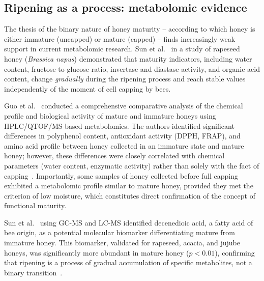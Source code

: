 \subsection{Ripening as a process: metabolomic evidence}

The thesis of the binary nature of honey maturity -- according to
which honey is either immature (uncapped) or mature (capped) --
finds increasingly weak support in current metabolomic research.
Sun et al.~\cite{sun2021} in a study of rapeseed honey
(\textit{Brassica napus}) demonstrated that maturity indicators,
including water content, fructose-to-glucose ratio, invertase and
diastase activity, and organic acid content, change \emph{gradually}
during the ripening process and reach stable values independently
of the moment of cell capping by bees.

Guo et al.~\cite{guo2020} conducted a comprehensive comparative
analysis of the chemical profile and biological activity of mature
and immature honeys using HPLC/QTOF/MS-based metabolomics. The
authors identified significant differences in polyphenol content,
antioxidant activity (DPPH, FRAP), and amino acid profile between
honey collected in an immature state and mature honey; however,
these differences were closely correlated with chemical parameters
(water content, enzymatic activity) rather than solely with
the fact of capping~\cite{guo2020}. Importantly, some samples of
honey collected before full capping exhibited a metabolomic profile
similar to mature honey, provided they met the criterion of low
moisture, which constitutes direct confirmation of the concept
of functional maturity.

Sun et al.~\cite{sun2021} using GC-MS and LC-MS identified
decenedioic acid, a fatty acid of bee origin, as a potential
molecular biomarker differentiating mature from immature honey.
This biomarker, validated for rapeseed, acacia, and jujube honeys,
was significantly more abundant in mature honey ($p < 0.01$),
confirming that ripening is a process of gradual accumulation of
specific metabolites, not a binary transition~\cite{sun2021}.

